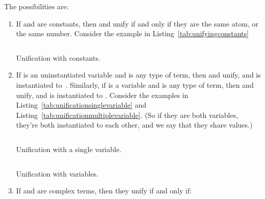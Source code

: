 \documentclass[thesis-solanki.tex]{subfiles}
\begin{document}
The possibilities are:
\begin{enumerate}
\item
  If  and  are constants, then  and  unify if and only if they are the
  same atom, or the same number.
  Consider the example in Listing~\ref{tab:unifyingconstants}
  \par
  \begin{code-list}[H]
    \begin{singlespace}
      \inputminted{prolog}{prolog-pwp-unify-constants.pl}
    \end{singlespace}
    \caption{Unification with constants.}
    \label{tab:unifyingconstants}
  \end{code-list}


\item
  If  is an uninstantiated variable and  is any type of term, then 
  and  unify, and  is instantiated to \,.
  Similarly, if  is a variable and  is any type of term, then  and 
  unify, and  is instantiated to .
  Consider the examples in Listing~\ref{tab:unificationsinglevariable} and 
  Listing~\ref{tab:unificationmultiplevariable}.
  (So if they are both variables, they're both instantiated to each other, and we say that they share values.)
  \par
  \begin{code-list}[H]
    \begin{singlespace}
      \inputminted{prolog}{prolog-pwp-unify-single-variable.pl}
    \end{singlespace}
    \caption{Unification with a single variable.}
    \label{tab:unificationsinglevariable}
  \end{code-list}

  \begin{code-list}[H]
    \begin{singlespace}
      \inputminted{prolog}{prolog-pwp-unify-multi-variable.pl}
    \end{singlespace}
    \caption{Unification with variables.}
    \label{tab:unificationmultiplevariable}
  \end{code-list}


\item
  If  and  are complex terms, then they unify if and only if:


\end{enumerate}
\end{document}
